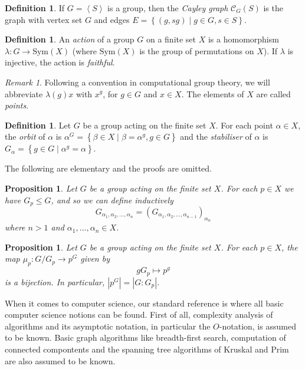\documentclass[draft]{amsart}
\theoremstyle{plain}
\newtheorem{pr}[theorem]{Proposition}
\theoremstyle{definition}
\newtheorem{deff}[theorem]{Definition}
\theoremstyle{remark}
\newtheorem{remark}{Remark}
\providecommand{\abs}[1]{\left\lvert #1 \right\rvert}
\providecommand{\set}[1]{\left\lbrace #1 \right\rbrace}
\providecommand{\gen}[1]{\left\langle #1 \right\rangle}
\providecommand{\Sym}[1]{\text{Sym}( #1 )}
\newcommand{\C}{\mathcal{C}}
\begin{document}
\begin{deff}
If $G = \gen{S}$ is a group, then the \emph{Cayley graph} $\C_G(S)$ is the graph with vertex set $G$ and edges $E = \set{ (g, sg) \mid g \in G, s \in S}$.
\end{deff}

\begin{deff}
An \emph{action} of a group $G$ on a finite set $X$ is a homomorphism
$\lambda : G \to \Sym{X}$ (where $\Sym{X}$ is the group of
permutations on $X$). If $\lambda$ is injective, the action is
\emph{faithful}. 
\end{deff}
\begin{remark}
Following a convention in computational group theory, we will
abbreviate $\lambda(g)x$ with $x^g$, for $g \in G$ and $x \in X$. The elements of $X$ are called \emph{points}.
\end{remark}

\begin{deff}
Let $G$ be a group acting on the finite set $X$. For each point
$\alpha \in X$, the \emph{orbit} of $\alpha$ is $\alpha^G = \set{\beta
\in X \mid \beta = \alpha^g, g \in G}$ and the \emph{stabiliser} of
$\alpha$ is $G_{\alpha} = \set{g \in G \mid \alpha^g = \alpha}$.
\end{deff}

The following are elementary and the proofs are omitted.
\begin{pr}
Let $G$ be a group acting on the finite set $X$. For each $p \in X$ we have $G_p \leq G$, and so we can define inductively 
\begin{equation}
G_{\alpha_1, \alpha_2, \dotsc, \alpha_n} = (G_{\alpha_1, \alpha_2, \dotsc, \alpha_{n - 1}})_{\alpha_n}
\end{equation}
where $n > 1$ and $\alpha_1, \dotsc, \alpha_n \in X$.
\end{pr}

\begin{pr}
Let $G$ be a group acting on the finite set $X$. For each $p \in X$, the map $\mu_p : G / G_p \to p^G$ given by
\begin{equation}
g G_p \mapsto p^g
\end{equation}
is a bijection. In particular, $\abs{p^G} = \abs{G : G_p}$.
\end{pr}

When it comes to computer science, our standard reference is
\cite{clr90} where all basic computer science notions can be
found. First of all, complexity analysis of algorithms and its
asymptotic notation, in particular the $O$-notation, is assumed to be
known. Basic graph algorithms like breadth-first search, computation
of connected compontents and the spanning tree algorithms of Kruskal
and Prim are also assumed to be known.
\end{document}

